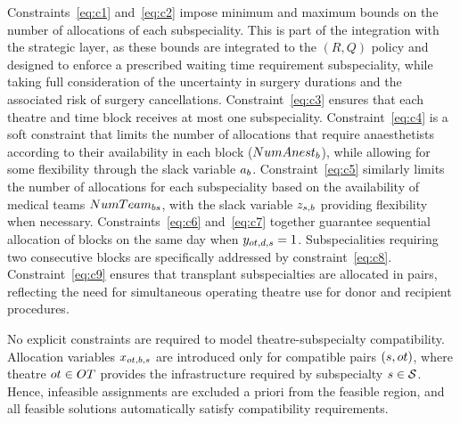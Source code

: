Constraints~\eqref{eq:c1} and~\eqref{eq:c2} impose minimum and maximum bounds on the number of allocations of each subspeciality.
This is part of the integration with the strategic layer, as these bounds are integrated to the $(R,Q)$ policy and designed to enforce a prescribed waiting time requirement subspeciality, while taking full consideration of the uncertainty in surgery durations and the associated risk of surgery cancellations. %
Constraint~\eqref{eq:c3} ensures that each theatre and time block receives at most one subspeciality.
Constraint~\eqref{eq:c4} is a soft constraint that limits the number of allocations that require anaesthetists according to their availability in each block ($NumAnest_{b}$), while allowing for some flexibility through the slack variable $a_{b}$.
Constraint~\eqref{eq:c5} similarly limits the number of allocations for each subspeciality based on the availability of medical teams $NumTeam_{bs}$, with the slack variable $z_{s,b}$ providing flexibility when necessary.
Constraints~\eqref{eq:c6} and~\eqref{eq:c7} together guarantee sequential allocation of blocks on the same day when $y_{ot,d,s} = 1$.
Subspecialities requiring two consecutive blocks are specifically addressed by constraint~\eqref{eq:c8}.
Constraint~\eqref{eq:c9} ensures that transplant subspecialties are allocated in pairs, reflecting the need for simultaneous operating theatre use for donor and recipient procedures. %

No explicit constraints are required to model theatre-subspecialty compatibility. 
Allocation variables $x_{ot,b,s}$ are introduced only for compatible pairs $(s,ot)$, where theatre $ot \in OT$ provides the infrastructure required by subspecialty $s \in \mathcal{S}$. 
Hence, infeasible assignments are excluded a priori from the feasible region, and all feasible solutions automatically satisfy compatibility requirements.